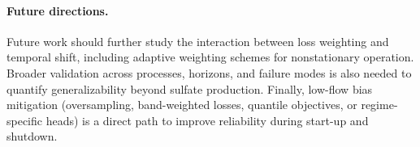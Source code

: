 \paragraph{Future directions.}
Future work should further study the interaction between loss weighting and temporal shift, including adaptive weighting schemes for nonstationary operation. Broader validation across processes, horizons, and failure modes is also needed to quantify generalizability beyond sulfate production. Finally, low-flow bias mitigation (oversampling, band-weighted losses, quantile objectives, or regime-specific heads) is a direct path to improve reliability during start-up and shutdown.
